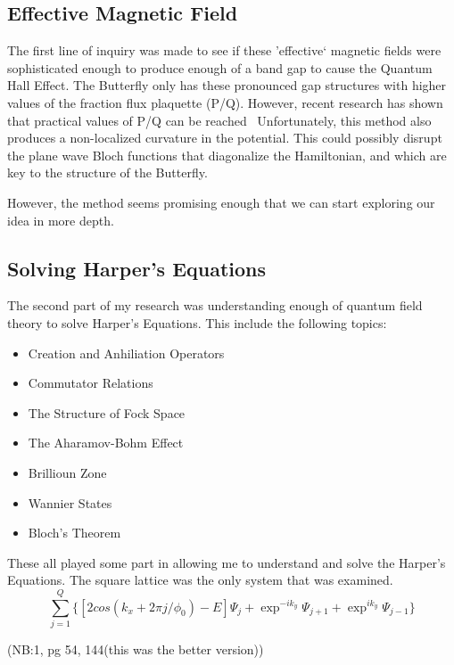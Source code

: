\documentclass[12pt]{article}
\begin{document}
\subsection{Effective Magnetic Field}
The first line of inquiry was made to see if these 'effective` magnetic fields were sophisticated enough
to produce enough of a band gap to cause the Quantum Hall Effect. The Butterfly only has these 
pronounced gap structures with higher values of the fraction flux plaquette (P/Q). However, recent research
has shown that practical values of P/Q can be reached~\cite{SPIELMAN2009} %
Unfortunately, this method also produces a non-localized curvature in the potential. This could possibly
disrupt the plane wave Bloch functions that diagonalize the Hamiltonian, and which are key to the structure of the
Butterfly.

However, the method seems promising enough that we can start exploring our idea
in more depth.
\subsection{Solving Harper's Equations}
The second part of my research was understanding enough of quantum field theory to solve Harper's Equations.
This include the following topics:

\begin{itemize}
\item Creation and Anhiliation Operators
\item Commutator Relations
\item The Structure of Fock Space
\item The Aharamov-Bohm Effect
\item Brillioun Zone
\item Wannier States
\item Bloch's Theorem
\end{itemize}
These all played some part in allowing me to understand and solve the Harper's Equations.
The square lattice was the only system that was examined.
\[
\sum^Q_{j=1} \{ [2cos(k_x + 2 \pi j / \phi_0) -E ] \Psi_j +\exp^{-i k_y} \Psi_{j+1} + \exp^{ik_y} \Psi_{j-1} \}
\]

(NB:1, pg 54, 144(this was the better version))
\end{document}
